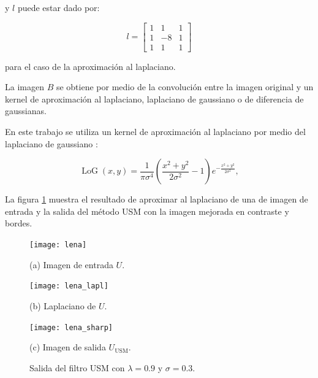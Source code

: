 y $l$ puede estar dado por:

\begin{equation} l = \left[
\begin{array}{ccc}
1 & 1 & 1\\
1 & -8 & 1\\
1 & 1 & 1
\end{array}\right]
\end{equation}

para el caso de la aproximación al laplaciano.

La imagen $B$ se obtiene por medio de la convolución entre la imagen original y un kernel de aproximación al laplaciano, laplaciano de gaussiano o de diferencia de gaussianas.


En este trabajo se utiliza un kernel de aproximación al laplaciano por medio del laplaciano de gaussiano \cite{sotak1989laplacian}:

\begin{equation}
\label{eq:log}
\operatorname{LoG}(x,y) = \frac{1}{\pi\sigma^4}\left(\frac{x^2+y^2}{2\sigma^2} - 1\right)e^{-\frac{x^2+y^2}{2\sigma^2}},
\end{equation}

La figura \ref{fig:exampleUSM} muestra el resultado de aproximar al laplaciano de una de imagen de entrada y la salida del método USM con la imagen mejorada en contraste y bordes. 

\begin{figure}[H]
%
\begin{minipage}{0.25\textwidth}
  \centering
  \centerline{\texttt{[image: lena]}}
  \centerline{(a) Imagen de entrada $U$.}\medskip
\end{minipage}
\hfill
\begin{minipage}{0.25\textwidth}
  \centering
  \centerline{\texttt{[image: lena\_lapl]}}
  \centerline{(b) Laplaciano de $U$.}
\end{minipage}
\hfill
\begin{minipage}{0.25\textwidth}
  \centering
  \centerline{\texttt{[image: lena\_sharp]}}
  \centerline{(c) Imagen de salida $U_{\textrm{USM}}$.}\medskip
\end{minipage}
%
\caption[Ejemplo de mejora en imagen con ]{Salida del filtro USM con $\lambda = 0.9$ y $\sigma = 0.3$. \label{fig:exampleUSM}}
%
\end{figure}


